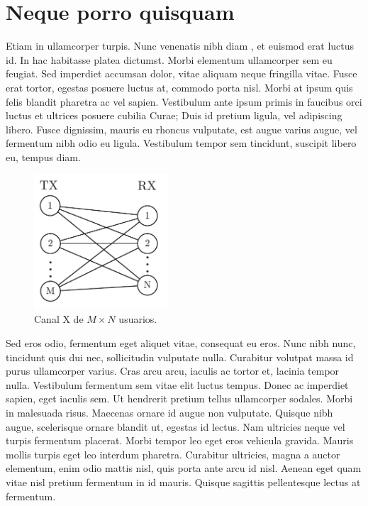 \chapter{Neque porro quisquam}

Etiam in ullamcorper turpis. Nunc venenatis nibh diam \cite{doe2016}, et euismod erat luctus id. In hac habitasse platea dictumst. Morbi elementum ullamcorper sem eu feugiat. Sed imperdiet accumsan dolor, vitae aliquam neque fringilla vitae. Fusce erat tortor, egestas posuere luctus at, commodo porta nisl. Morbi at ipsum quis felis blandit pharetra ac vel sapien. Vestibulum ante ipsum primis in faucibus orci luctus et ultrices posuere cubilia Curae; Duis id pretium ligula, vel adipiscing libero. Fusce dignissim, mauris eu rhoncus vulputate, est augue varius augue, vel fermentum nibh odio eu ligula. Vestibulum tempor sem tincidunt, suscipit libero eu, tempus diam.

\begin{figure}[h!]
    \begin{center}
        \includegraphics[width=5cm]{content/fig/chap1/X_channel_MxN}
    \end{center}
   \caption{Canal X de $M\times N$ usuarios.}
  \label{fig:X_channel_MxN}
\end{figure}

Sed eros odio, fermentum eget aliquet vitae, consequat eu eros. Nunc nibh nunc, tincidunt quis dui nec, sollicitudin vulputate nulla. Curabitur volutpat massa id purus ullamcorper varius. Cras arcu arcu, iaculis ac tortor et, lacinia tempor nulla. Vestibulum fermentum sem vitae elit luctus tempus. Donec ac imperdiet sapien, eget iaculis sem. Ut hendrerit pretium tellus ullamcorper sodales. Morbi in malesuada risus. Maecenas ornare id augue non vulputate. Quisque nibh augue, scelerisque ornare blandit ut, egestas id lectus. Nam ultricies neque vel turpis fermentum placerat. Morbi tempor leo eget eros vehicula gravida. Mauris mollis turpis eget leo interdum pharetra. Curabitur ultricies, magna a auctor elementum, enim odio mattis nisl, quis porta ante arcu id nisl. Aenean eget quam vitae nisl pretium fermentum in id mauris. Quisque sagittis pellentesque lectus at fermentum.

